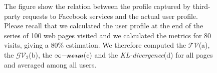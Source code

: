 \begin{figure}
\centering
    \hfil
    
    \hfil

\caption[How Facebook track the user's profile]{The figure show the relation between the profile captured by third-party requests to Facebook services and the actual user profile. Please recall that we calculated the user profile at the end of the series of 100 web pages visited and we calculated the metrics for 80 visits, giving a 80\% estimation.%
We therefore computed the $\mathcal{TV}$(a), the $\mathcal{GV_2}$(b), the $\infty\mathcal{-norm}$(c) and the \emph{KL-divergence}(d) for all pages and averaged among all users.}
\label{fig:average-facebook-pages-tracker}%
\end{figure}

